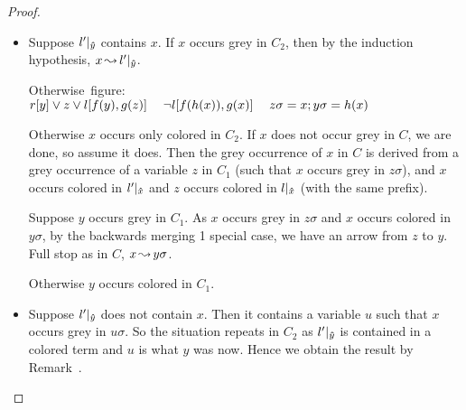 \documentclass[,%
	paper=a4,%
	DIV11, %
	twoside=false,%
	liststotoc,
	bibtotoc,
	draft=false,%
	numbers=noendperiod
]{scrartcl}
\begin{document}
\begin{proof}
\begin{description}
			\begin{itemize}
				\item Suppose $l'|_{\bm\hat y}$ contains $x$.
					If $x$ occurs grey in $C_2$, then by the induction hypothesis,
					$x\operatorname{\leadsto} l'|_{\bm\hat y}$.

					\mbox{Otherwise figure: $ r[y] \lor z \lor l[f(y), g(z)]\quad\; \lnot l[f(h(x)), g(x)]\;\quad z\sigma = x;y\sigma=h(x)$}

					Otherwise $x$ occurs only colored in $C_2$.
					If $x$ does not occur grey in $C$, we are done, so assume it does.
					Then the grey occurrence of $x$ in $C$ is derived from a grey occurrence of a variable $z$ in $C_1$ (such that $x$ occurs grey in $z\sigma$), and $x$ occurs colored in $l'|_{\bm\hat x}$ and $z$ occurs colored in $l|_{\bm\hat x}$ (with the same prefix).

					Suppose $y$ occurs grey in $C_1$.
					As $x$ occurs grey in $z\sigma$ and $x$ occurs colored in $y\sigma$, by the backwards merging 1 special case, we have an arrow from $z$ to $y$. Full stop as in $C$, $x\operatorname{\leadsto} y\sigma$.

					Otherwise $y$ occurs colored in $C_1$.






				\item Suppose $l'|_{\bm\hat y}$ does not contain $x$.
					Then it contains a variable $u$ such that $x$ occurs grey in $u\sigma$. 
					So the situation repeats in $C_2$ as $l'|_{\bm\hat y}$ is contained in a colored term and $u$ is what $y$ was now.
					Hence we obtain the result by Remark~\substremarkref.

			\end{itemize}



	\end{description}
\end{proof}
\end{document}
